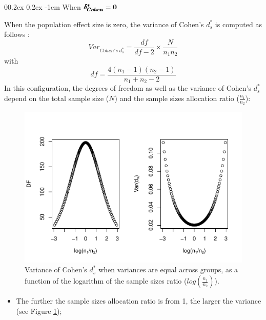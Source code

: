 \documentclass[
  english,
  man]{apa6}
\makeatletter
\providecommand{\tightlist}{%
  \setlength{\itemsep}{0pt}\setlength{\parskip}{0pt}}
\let\oldparagraph\paragraph
\renewcommand{\paragraph}[1]{\oldparagraph{#1}\mbox{}}
\renewcommand{\paragraph}{\@startsection{paragraph}{4}{\parindent}%
  {0\baselineskip \@plus 0.2ex \@minus 0.2ex}%
  {-1em}%
  {\normalfont\normalsize\bfseries\itshape\typesectitle}}
\makeatother
\begin{document}
\hypertarget{when-bf-pmbdelta_cohen0-1}{%
\paragraph{\texorpdfstring{When \(\bf \pmb{\delta^*_{Cohen}}=0\)}{When \textbackslash bf \textbackslash pmb\{\textbackslash delta\^{}*\_\{Cohen\}\}=0}}\label{when-bf-pmbdelta_cohen0-1}}

When the population effect size is zero, the variance of Cohen's \(d^*_s\) is computed as follows :
\[Var_{Cohen's \; d^*_s} = \frac{df}{df-2} \times \frac{N}{n_1n_2}\]
with \[df = \frac{4(n_1-1)(n_2-1)}{n_1+n_2-2}\]
In this configuration, the degrees of freedom as well as the variance of Cohen's \(d^*_s\) depend on the total sample size (\(N\)) and the sample sizes allocation ratio (\(\frac{n_1}{n_2}\)):

\begin{figure}
\centering
\includegraphics{Theoretical-Variance-of-all-estimators-as-a-function-of-population-parameters_files/figure-latex/varcohendprimeHomNratio2-1.pdf}
\caption{\label{fig:varcohendprimeHomNratio2}Variance of Cohen's \(d^*_s\) when variances are equal across groups, as a function of the logarithm of the sample sizes ratio (\(log\left(\frac{n_1}{n_2} \right)\)).}
\end{figure}

\begin{itemize}
\tightlist
\item
  The further the sample sizes allocation ratio is from 1, the larger the variance (see Figure \ref{fig:varcohendprimeHomNratio2});
\end{itemize}
\end{document}

